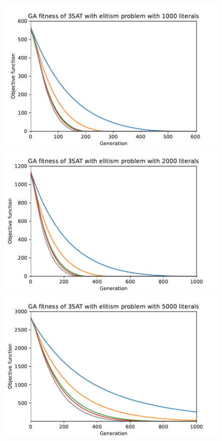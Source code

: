\begin{figure}[ht!]
    \begin{minipage}[t]{0.32\textwidth}
        \centering
        \includegraphics[width=\textwidth]{img/runs/fitness_ga_elitism_3SAT_d1000.pdf}
    \end{minipage}
    \hfill
    \begin{minipage}[t]{0.32\textwidth}
        \centering
        \includegraphics[width=\textwidth]{img/runs/fitness_ga_elitism_3SAT_d2000.pdf}
    \end{minipage}
    \hfill
    \begin{minipage}[t]{0.32\textwidth}
        \centering
        \includegraphics[width=\textwidth]{img/runs/fitness_ga_elitism_3SAT_d5000.pdf}
    \end{minipage}


\end{figure}
